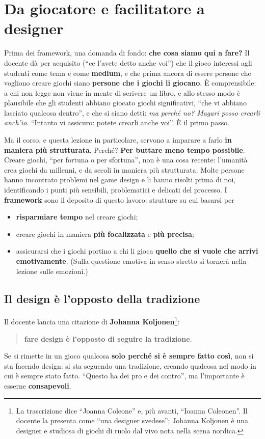 \section{Da giocatore e facilitatore a designer}
\label{a3:sec:designer}

Prima dei framework, una domanda di fondo: \textbf{che cosa siamo qui a fare?}
Il docente dà per acquisito (``ce l'avete detto anche voi'') che il gioco
interessi agli studenti come tema e come \textbf{medium}, e che prima ancora di
essere persone che vogliono creare giochi siano \textbf{persone che i giochi li
giocano}. È comprensibile: a chi non legge non viene in mente di scrivere un
libro, e allo stesso modo è plausibile che gli studenti abbiano giocato giochi
significativi, ``che vi abbiano lasciato qualcosa dentro'', e che si siano
detti: \emph{ma perché no? Magari posso crearli anch'io}. ``Intanto vi
assicuro: potete crearli anche voi''. È il primo passo.

Ma il corso, e questa lezione in particolare, servono a imparare a farlo
\textbf{in maniera più strutturata}. Perché? \textbf{Per buttare meno tempo
possibile}. Creare giochi, ``per fortuna o per sfortuna'', non è una cosa
recente: l'umanità crea giochi da millenni, e da secoli in maniera più
strutturata. Molte persone hanno incontrato problemi nel game design e li hanno
risolti prima di noi, identificando i punti più sensibili, problematici e
delicati del processo. I \textbf{framework} sono il deposito di questo lavoro:
strutture su cui basarsi per
\begin{itemize}
  \item \textbf{risparmiare tempo} nel creare giochi;
  \item creare giochi in maniera \textbf{più focalizzata} e \textbf{più precisa};
  \item assicurarsi che i giochi portino a chi li gioca \textbf{quello che si
        vuole che arrivi emotivamente}. (Sulla questione emotiva in senso
        stretto si tornerà nella lezione sulle emozioni.)
\end{itemize}

\subsection{Il design è l'opposto della tradizione}

Il docente lancia una citazione di \textbf{Johanna Koljonen}\footnote{La
trascrizione dice ``Joanna Coleone'' e, più avanti, ``Ioanna Coleonen''. Il
docente la presenta come ``una designer svedese''; Johanna Koljonen è una
designer e studiosa di giochi di ruolo dal vivo nota nella scena nordica.}:
\begin{quote}
\textbf{fare design è l'opposto di seguire la tradizione}.
\end{quote}
Se si rimette in un gioco qualcosa \textbf{solo perché si è sempre fatto così},
non si sta facendo design: si sta seguendo una tradizione, creando qualcosa nel
modo in cui è sempre stato fatto. ``Questo ha dei pro e dei contro'', ma
l'importante è esserne \textbf{consapevoli}.

